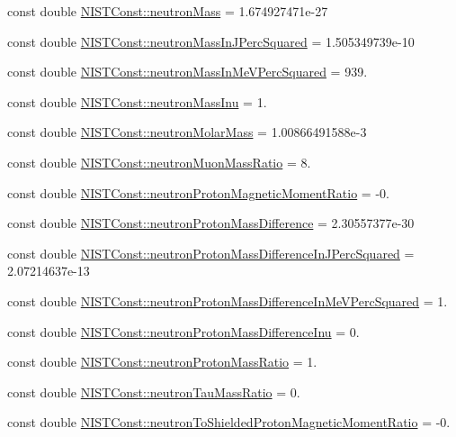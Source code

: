 \begin{DoxyCompactItemize}
\item 
const double \hyperlink{group___n_i_s_t_const-_neutron_ga74edcc04e59f152b2afa0fdba8683383}{N\+I\+S\+T\+Const\+::neutron\+Mass} = 1.\+674927471e-\/27
\item 
const double \hyperlink{group___n_i_s_t_const-_neutron_ga28892913d6ed40673a170941f79bb86e}{N\+I\+S\+T\+Const\+::neutron\+Mass\+In\+J\+Perc\+Squared} = 1.\+505349739e-\/10
\item 
const double \hyperlink{group___n_i_s_t_const-_neutron_ga53f986a22e4dcb31cc8ed8151fd18a8e}{N\+I\+S\+T\+Const\+::neutron\+Mass\+In\+Me\+V\+Perc\+Squared} = 939.
\item 
const double \hyperlink{group___n_i_s_t_const-_neutron_ga7931fb41eb5f1acf4b94d9d6b92ca4c3}{N\+I\+S\+T\+Const\+::neutron\+Mass\+Inu} = 1.
\item 
const double \hyperlink{group___n_i_s_t_const-_neutron_ga0f7ab7fc272f54c17ecf777efff7003b}{N\+I\+S\+T\+Const\+::neutron\+Molar\+Mass} = 1.\+00866491588e-\/3
\item 
const double \hyperlink{group___n_i_s_t_const-_neutron_ga91ae8b70076ca6001d2141d1df72a39c}{N\+I\+S\+T\+Const\+::neutron\+Muon\+Mass\+Ratio} = 8.
\item 
const double \hyperlink{group___n_i_s_t_const-_neutron_ga98c2f64e48dbd352a997b82d8815daba}{N\+I\+S\+T\+Const\+::neutron\+Proton\+Magnetic\+Moment\+Ratio} = -\/0.
\item 
const double \hyperlink{group___n_i_s_t_const-_neutron_ga95ef0427b50433511707f0949fc503b9}{N\+I\+S\+T\+Const\+::neutron\+Proton\+Mass\+Difference} = 2.\+30557377e-\/30
\item 
const double \hyperlink{group___n_i_s_t_const-_neutron_gaa89b2b23475d809d4d3a4c46e7556b71}{N\+I\+S\+T\+Const\+::neutron\+Proton\+Mass\+Difference\+In\+J\+Perc\+Squared} = 2.\+07214637e-\/13
\item 
const double \hyperlink{group___n_i_s_t_const-_neutron_gae96854e1fcd14f08cc92a060c6690730}{N\+I\+S\+T\+Const\+::neutron\+Proton\+Mass\+Difference\+In\+Me\+V\+Perc\+Squared} = 1.
\item 
const double \hyperlink{group___n_i_s_t_const-_neutron_ga570caff89957976a8486d25e5288df51}{N\+I\+S\+T\+Const\+::neutron\+Proton\+Mass\+Difference\+Inu} = 0.
\item 
const double \hyperlink{group___n_i_s_t_const-_neutron_gad8a08222b3de2105b5b399faa5a59fbd}{N\+I\+S\+T\+Const\+::neutron\+Proton\+Mass\+Ratio} = 1.
\item 
const double \hyperlink{group___n_i_s_t_const-_neutron_ga9c3ba7b26cbcc0b2f7f7fa551812683a}{N\+I\+S\+T\+Const\+::neutron\+Tau\+Mass\+Ratio} = 0.
\item 
const double \hyperlink{group___n_i_s_t_const-_neutron_ga7446ad6eb4c1e0b8167d1a1ff5c4cd89}{N\+I\+S\+T\+Const\+::neutron\+To\+Shielded\+Proton\+Magnetic\+Moment\+Ratio} = -\/0.
\end{DoxyCompactItemize}


